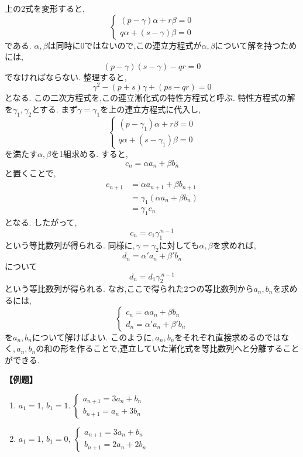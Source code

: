     上の2式を変形すると,
    \[
    \begin{cases}
      (p-\gamma)\alpha+r\beta=0\\
      q\alpha+(s-\gamma)\beta=0
    \end{cases}
    \]
    である.
    $\alpha,\beta$は同時に$0$ではないので,この連立方程式が$\alpha,\beta$について解を持つためには,
    \[
      (p-\gamma)(s-\gamma)-qr=0
    \]
    でなければならない.
    整理すると,
    \[
      \gamma^2-(p+s)\gamma+(ps-qr)=0
    \]
    となる.
    この二次方程式を,この連立漸化式の特性方程式と呼ぶ.
    特性方程式の解を$\gamma_1,\gamma_2$とする.
    まず$\gamma=\gamma_1$を上の連立方程式に代入し,
    \[
      \begin{cases}
        (p-\gamma_1)\alpha+r\beta=0\\
        q\alpha+(s-\gamma_1)\beta=0
      \end{cases}
    \]
    を満たす$\alpha,\beta$を1組求める.
    すると,
    \[
      c_n=\alpha a_n+\beta b_n
    \]
    と置くことで,
    \begin{align*}
      c_{n+1}&=\alpha a_{n+1}+\beta b_{n+1}\\
      &=\gamma_1(\alpha a_n+\beta b_n)\\
      &=\gamma_1c_n
    \end{align*}
    となる.
    したがって,
    \[
      c_n=c_1\gamma_1^{\,n-1}
    \]
    という等比数列が得られる.
    同様に,\,$\gamma=\gamma_2$に対しても$\alpha,\beta$を求めれば,
    \[
      d_n=\alpha' a_n+\beta' b_n
    \]
    について
    \[
      d_n=d_1\gamma_2^{\,n-1}
    \]
    という等比数列が得られる.
    なお,ここで得られた2つの等比数列から$a_n,b_n$を求めるには,
    \[
      \begin{cases}
      c_n=\alpha a_n+\beta b_n\\
      d_n=\alpha'a_n+\beta'b_n
      \end{cases}
    \]
    を$a_n,b_n$について解けばよい.
    このように,\,$a_n,b_n$をそれぞれ直接求めるのではなく,\,$a_n,b_n$の和の形を作ることで,連立していた漸化式を等比数列へと分離することができる.

    \noindent \textbf{【例題】}
    \begin{enumerate}[label=(\arabic*),parsep=3pt]
      \item $\displaystyle a_1=1,\,b_1=1.\ \begin{cases}a_{n+1}=3a_n+b_n\\ b_{n+1}=a_n+3b_n\end{cases}$
      \item $\displaystyle a_1=1,\,b_1=0,\ \begin{cases}a_{n+1}=3a_n+b_n\\ b_{n+1}=2a_n+2b_n\end{cases}$
    \end{enumerate}

